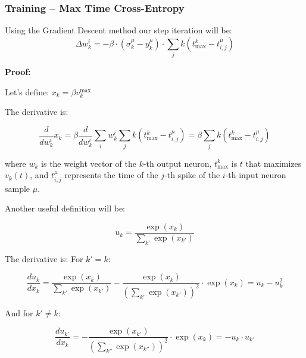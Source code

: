 \subsubsection{Training – Max Time Cross-Entropy}


\begin{mdframed}[backgroundcolor=red_background, linecolor=black, linewidth=2pt, frametitle=\textbf{Statement}]
\begin{center}

    \label{st:GD-cross-entr-tempotron}
    Using the Gradient Descent method our step iteration will be:
    \begin{equation}
        \Delta w_k^i = -\beta \cdot (\sigma_k^\mu - y_k^\mu) \cdot \sum_j k(t_{\max}^k - t_{i,j}^\mu)
    \end{equation}

\end{center}
\end{mdframed}

\textbf{Proof:}

Let's define: \(x_k = \beta v_k^{\max}\)

The derivative is:

\begin{equation}
    \frac{d}{dw_k^i} x_k = \beta \frac{d}{dw_k^i} \sum_i w_k^i \sum_j k(t_{\max}^k - t_{i,j}^\mu) = \beta \sum_j k(t_{\max}^k - t_{i,j}^\mu)
\end{equation}

where \(w_k\) is the weight vector of the \(k\)-th output neuron, \(t_{\max}^k\) is \(t\) that maximizes \(v_k(t)\), and \(t_{i,j}^\mu\) represents the time of the \(j\)-th spike of the \(i\)-th input neuron sample \(\mu\).

Another useful definition will be:

\begin{equation}
    u_k = \frac{\exp(x_k)}{\sum_{k'} \exp(x_{k'})}
\end{equation}

The derivative is:
For \(k' = k\):

\begin{equation}
    \frac{du_k}{dx_k} = \frac{\exp(x_k)}{\sum_{k'} \exp(x_{k'})} - \frac{\exp(x_k)}{\left(\sum_{k'} \exp(x_{k'})\right)^2} \cdot \exp(x_k) = u_k - u_k^2
\end{equation}

And for \(k' \neq k\):

\begin{equation}
    \frac{du_{k'}}{dx_k} = -\frac{\exp(x_{k'})}{\left(\sum_{k''} \exp(x_{k''})\right)^2} \cdot \exp(x_k) = -u_k \cdot u_{k'}
\end{equation}

